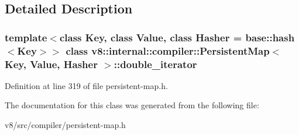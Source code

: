 \subsection{Detailed Description}
\subsubsection*{template$<$class Key, class Value, class Hasher = base\+::hash$<$\+Key$>$$>$\newline
class v8\+::internal\+::compiler\+::\+Persistent\+Map$<$ Key, Value, Hasher $>$\+::double\+\_\+iterator}



Definition at line 319 of file persistent-\/map.\+h.



The documentation for this class was generated from the following file\+:\begin{DoxyCompactItemize}
\item 
v8/src/compiler/persistent-\/map.\+h\end{DoxyCompactItemize}
